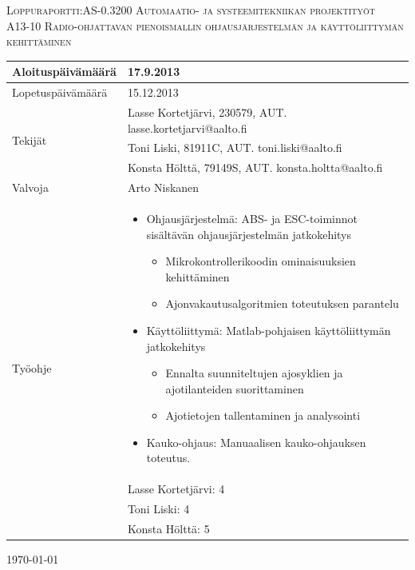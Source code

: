 \documentclass{article}
\begin{document}
\begin{titlepage}
\begin{center}

\textsc{ \LARGE Loppuraportti:AS-0.3200 Automaatio- ja systeemitekniikan projektityöt }\\[1.5cm]

\textsc{ \Large A13-10 Radio-ohjattavan pienoismallin ohjausjärjestelmän ja käyttöliittymän kehittäminen }\\[0.5cm]

\begin{tabular}{ l | p{12cm} }
	\hline
	Aloituspäivämäärä & 17.9.2013\\

	\hline
	Lopetuspäivämäärä & 15.12.2013\\

	\hline
	\multirow{3}{*}{Tekijät}
	& Lasse Kortetjärvi, 230579, AUT. lasse.kortetjarvi@aalto.fi\\
	& Toni Liski, 81911C, AUT. toni.liski@aalto.fi\\
	& Konsta Hölttä, 79149S, AUT. konsta.holtta@aalto.fi\\

	\hline
	Valvoja & Arto Niskanen\\

	\hline
	\multirow{8}{*}{Työohje} &
	\begin{itemize}
	\item Ohjausjärjestelmä: ABS- ja ESC-toiminnot sisältävän ohjausjärjestelmän jatkokehitys\begin{itemize}
	\item Mikrokontrollerikoodin ominaisuuksien kehittäminen
	\item Ajonvakautusalgoritmien toteutuksen parantelu
	\end{itemize}

	\item Käyttöliittymä: Matlab-pohjaisen käyttöliittymän jatkokehitys \begin{itemize}
	\item Ennalta suunniteltujen ajosyklien ja ajotilanteiden suorittaminen
	\item Ajotietojen tallentaminen ja analysointi
	\end{itemize}
	\item Kauko-ohjaus: Manuaalisen kauko-ohjauksen toteutus.
	\end{itemize} \\

	\hline
	\multirow{3}{*}{Opintopisteet}
	& Lasse Kortetjärvi: 4 \\
	& Toni Liski: 4 \\
	& Konsta Hölttä: 5 \\

	\hline
\end{tabular}

\vfill

{\large \today}

\end{center}
\end{titlepage}
\end{document}
